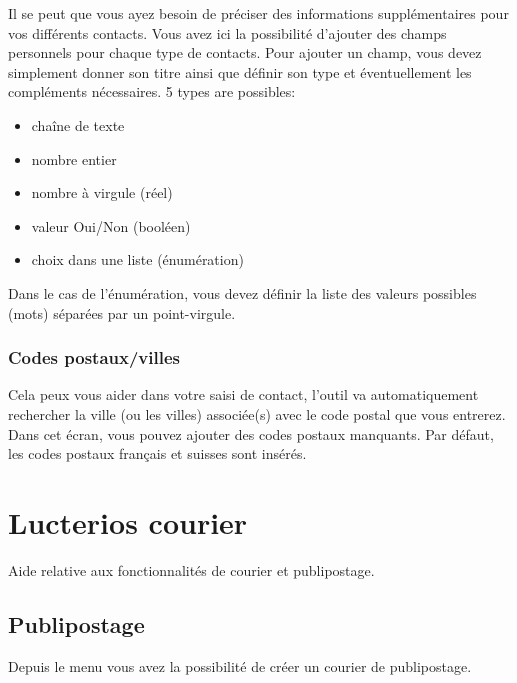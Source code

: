 \documentclass[a4paper,10pt,oneside,french]{sphinxmanual}
\begin{document}
Il se peut que vous ayez besoin de préciser des informations supplémentaires pour vos différents contacts. Vous avez ici la possibilité d’ajouter des champs personnels pour chaque type de contacts. Pour ajouter un champ, vous devez simplement donner son titre ainsi que définir son type et éventuellement les compléments nécessaires.
5 types are possibles:
\begin{itemize}
\item {} 
chaîne de texte

\item {} 
nombre entier

\item {} 
nombre à virgule (réel)

\item {} 
valeur Oui/Non (booléen)

\item {} 
choix dans une liste (énumération)

\end{itemize}

Dans le cas de l’énumération, vous devez définir la liste des valeurs possibles (mots) séparées par un point-virgule.


\subsection{Codes postaux/villes}
\label{\detokenize{contacts/configuration:codes-postaux-villes}}
Cela peux vous aider dans votre saisi de contact, l’outil va automatiquement rechercher la ville (ou les villes) associée(s) avec le code postal que vous entrerez.
Dans cet écran, vous pouvez ajouter des codes postaux manquants.
Par défaut, les codes postaux français et suisses sont insérés.


\chapter{Lucterios courier}
\label{\detokenize{mailing/index:lucterios-courier}}\label{\detokenize{mailing/index::doc}}
Aide relative aux fonctionnalités de courier et publipostage.


\section{Publipostage}
\label{\detokenize{mailing/mailing:publipostage}}\label{\detokenize{mailing/mailing::doc}}
Depuis le menu  vous avez la possibilité de créer un courier de publipostage.
\end{document}
